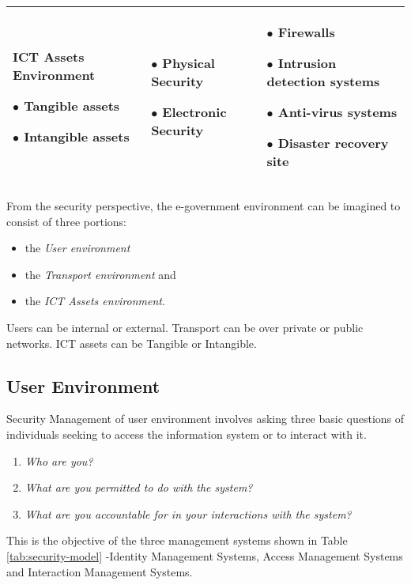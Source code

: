 \begin{landscape}
\begin{table}[ht]
\begin{tabular}{p{5.5cm}p{5.5cm}p{5.5cm}}
 		 {\bfseries ICT Assets Environment\par}{$\bullet$ Tangible assets\par $\bullet$ Intangible assets} & {$\bullet$ Physical Security\par $\bullet$ Electronic Security\par} & {$\bullet$ Firewalls\par $\bullet$ Intrusion detection systems\par $\bullet$ Anti-virus systems\par $\bullet$ Disaster recovery site} \\ 
 		\bottomrule
 	\end{tabular}
 \end{table}
\end{landscape}
 
 From the security perspective, the e-government environment can be imagined to consist of three portions: 
 \begin{itemize}
 	\item the \textit{User environment}
 	\item the \textit{Transport environment} and
 	\item the \textit{ICT Assets environment}.
 \end{itemize} 
Users can be internal or external. Transport can be over private or public networks. ICT assets can be Tangible or Intangible.

\subsection{User Environment}
Security Management of user environment involves asking three basic questions of
individuals seeking to access the information system or to interact with it.
\begin{enumerate}
	\item \textit{Who are you?}
	\item \textit{What are you permitted to do with the system?}
	\item \textit{What are you accountable for in your interactions with the system?}
\end{enumerate}

 This is the objective of the three management systems shown in Table {\ref{tab:security-model}} -Identity Management Systems, Access Management Systems and Interaction Management Systems. 
 
